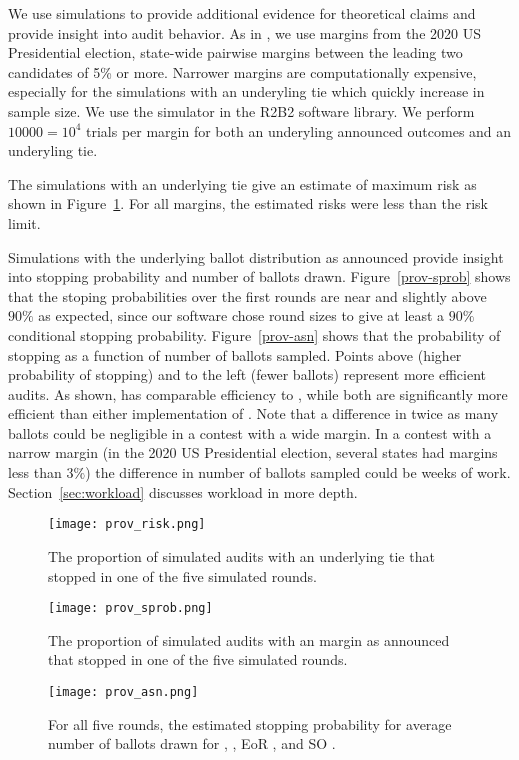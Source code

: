 We use simulations to provide additional evidence for theoretical claims and provide insight into audit behavior. As in \cite{sims}, we use margins from the 2020 US Presidential election, state-wide pairwise margins between the leading two candidates of 5\% or more. Narrower margins are computationally expensive, especially for the simulations with an underyling tie which quickly increase in sample size. We use the simulator in the R2B2 software library\cite{r2b2}. We perform $10000=10^4$ trials per margin for both an underyling announced outcomes and an underyling tie.

The simulations with an underlying tie give an estimate of maximum risk as shown in Figure~\ref{fig:prov-risk}. For all margins, the estimated risks were less than the risk limit.

Simulations with the underlying ballot distribution as announced provide insight into stopping probability and number of ballots drawn. Figure~\ref{prov-sprob} shows that the stoping probabilities over the first rounds are near and slightly above $90\%$ as expected, since our software chose round sizes to give at least a $90\%$ conditional stopping probability.
Figure~\ref{prov-asn} shows that the probability of stopping as a function of number of ballots sampled. Points above (higher probability of stopping) and to the left (fewer ballots) represent more efficient audits. As shown, \Providence has comparable efficiency to \Minerva, while both are significantly more efficient than either implementation of \BRAVO. Note that a difference in twice as many ballots could be negligible in a contest with a wide margin. In a contest with a narrow margin (in the 2020 US Presidential election, several states had margins less than $3\%$) the difference in number of ballots sampled could be weeks of work. Section~\ref{sec:workload} discusses workload in more depth.

\begin{figure}
\texttt{[image: prov\_risk.png]}
\caption{The proportion of simulated audits with an underlying tie that stopped in one of the five simulated rounds.}
\label{fig:prov-risk}
\end{figure}

\begin{figure}
\texttt{[image: prov\_sprob.png]}
\caption{The proportion of simulated audits with an margin as announced that stopped in one of the five simulated rounds.}
\label{fig:prov-sprob}
\end{figure}

\begin{figure}
\texttt{[image: prov\_asn.png]}
\caption{For all five rounds, the estimated stopping probability for average number of ballots drawn for \Providence, \Minerva, EoR \BRAVO, and SO \BRAVO.}
\label{fig:prov-asn}
\end{figure}








